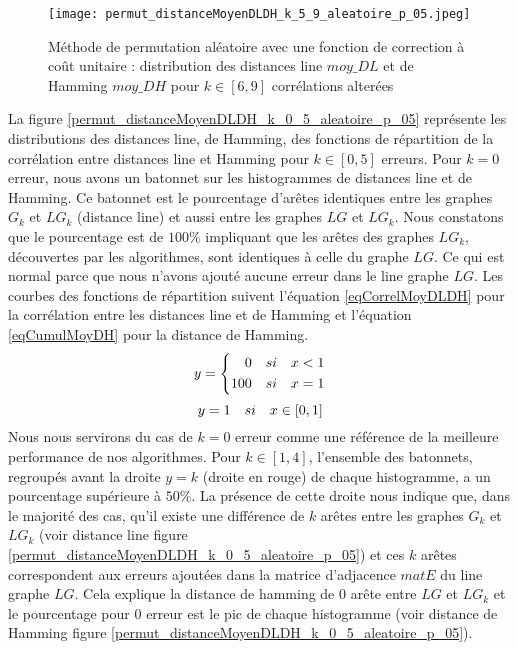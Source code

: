 \documentclass[onecolumn, 12pt]{book}
\begin{document}
\begin{figure}[htb!] 
\centering
\texttt{[image: permut\_distanceMoyenDLDH\_k\_5\_9\_aleatoire\_p\_05.jpeg]}
\caption{ M\'ethode de permutation al\'eatoire avec une fonction de correction \`a co\^ut unitaire : distribution des distances line $moy\_DL$ et de Hamming $moy\_DH$ pour $k \in [6,  9]$ corr\'elations alter\'ees}
\label{permut_distanceMoyenDLDH_k_5_9_aleatoire_p_05} 
\end{figure}


La figure \ref{permut_distanceMoyenDLDH_k_0_5_aleatoire_p_05} repr\'esente les distributions des distances line, de Hamming, des fonctions de r\'epartition de la corr\'elation entre distances line et Hamming pour $k \in [0,5]$ erreurs. \newline
Pour $k=0$ erreur, nous avons un batonnet sur les histogrammes de distances line et de Hamming. Ce batonnet est le pourcentage d'ar\^etes identiques entre les graphes $G_k$ et $LG_k$ (distance line) et aussi entre les graphes  $LG$ et $LG_k$. Nous constatons que  le pourcentage est de $100\%$ impliquant que les ar\^etes des graphes $LG_k$, d\'ecouvertes par les algorithmes, sont identiques \`a celle du graphe $LG$. Ce qui est normal parce que nous n'avons ajout\'e aucune erreur dans le line graphe $LG$. Les courbes des fonctions de r\'epartition  suivent l'\'equation \ref{eqCorrelMoyDLDH} pour la corr\'elation entre les distances line et de Hamming et l'\'equation \ref{eqCumulMoyDH} pour la distance de Hamming.
\begin{equation}
\label{eqCorrelMoyDLDH}
y = \left\{
	\begin{aligned}
	0 \hspace{1 em} si \hspace{1 em} x < 1 \\
	100  \hspace{1 em}  si  \hspace{1 em}  x = 1
	\end{aligned}
	\right.
\end{equation}
\begin{equation}
\label{eqCumulMoyDH}
y = 1  \hspace{1 em}  si  \hspace{1 em}   x \in [0,1]
\end{equation}
Nous nous servirons du cas de $k=0$ erreur comme une r\'ef\'erence de la meilleure performance de nos algorithmes.
\newline
Pour $k \in [1,4]$, l'ensemble des batonnets, regroup\'es avant la droite $y = k$ (droite en rouge) de chaque histogramme, a un pourcentage sup\'erieure \`a $50 \%$. La pr\'esence de cette droite nous indique que, dans le majorit\'e des cas,  qu'il existe une diff\'erence de $k$ ar\^etes entre les graphes $G_k$ et $LG_k$ (voir distance line figure \ref{permut_distanceMoyenDLDH_k_0_5_aleatoire_p_05}) et ces $k$ ar\^etes correspondent aux erreurs ajout\'ees dans la matrice d'adjacence $matE$ du line graphe $LG$. Cela explique 
la distance de hamming de $0$ ar\^ete entre $LG$ et $LG_k$ et le pourcentage pour $0$ erreur est le pic de chaque histogramme (voir distance de Hamming figure \ref{permut_distanceMoyenDLDH_k_0_5_aleatoire_p_05}).
\end{document}
